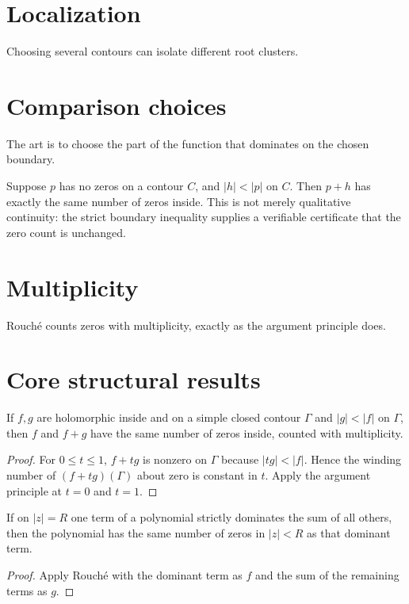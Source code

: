 \section{Localization}
Choosing several contours can isolate different root clusters.

\section{Comparison choices}
The art is to choose the part of the function that dominates on the chosen boundary.

\begin{example}\label{ex:iv13-expand-03}
Suppose \(p\) has no zeros on a contour \(C\), and \(|h|<|p|\) on \(C\). Then \(p+h\) has exactly the same number of zeros inside. This is not merely qualitative continuity: the strict boundary inequality supplies a verifiable certificate that the zero count is unchanged.
\end{example}
\section{Multiplicity}
Rouché counts zeros with multiplicity, exactly as the argument principle does.

\section{Core structural results}

\begin{theorem}\label{thm:iv13-01}
If $f,g$ are holomorphic inside and on a simple closed contour $\Gamma$ and $|g|<|f|$ on $\Gamma$, then $f$ and $f+g$ have the same number of zeros inside, counted with multiplicity.
\begin{proof}
For $0\le t\le1$, $f+tg$ is nonzero on $\Gamma$ because $|tg|<|f|$. Hence the winding number of $(f+tg)(\Gamma)$ about zero is constant in $t$. Apply the argument principle at $t=0$ and $t=1$.
\end{proof}
\end{theorem}

\begin{theorem}\label{thm:iv13-02}
If on $|z|=R$ one term of a polynomial strictly dominates the sum of all others, then the polynomial has the same number of zeros in $|z|<R$ as that dominant term.
\begin{proof}
Apply Rouché with the dominant term as $f$ and the sum of the remaining terms as $g$.
\end{proof}
\end{theorem}

